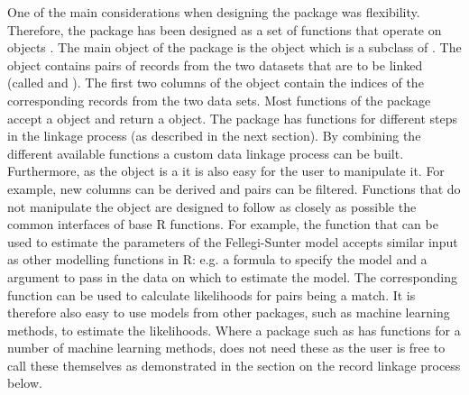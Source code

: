 One of the main considerations when designing the package was flexibility. Therefore, the package
has been designed as a set of functions that operate on  objects
\citep{datatable}. The main object of the package is the  object which is a subclass of
. The  object contains pairs of records from the two datasets that are
to be linked (called  and ). The first two columns of the  object
contain the indices of the corresponding records from the two data sets.  Most functions of the
package accept a  object and return a  object. The package has functions for
different steps in the linkage process (as described in the next section).  By combining the
different available functions a custom data linkage process can be built. Furthermore, as the
 object is a  it is also easy for the user to manipulate it. For
example, new columns can be derived and pairs can be filtered. Functions that do not manipulate the
 object are designed to follow as closely as possible the common interfaces of base R
functions. For example, the function  that can be used to estimate the parameters
of the Fellegi-Sunter model accepts similar input as other modelling functions in R: e.g. a formula
to specify the model and a  argument to pass in the data on which to estimate the model.
The corresponding  function can be used to calculate likelihoods for pairs being a
match.  It is therefore also easy to use models from other packages, such as machine learning
methods, to estimate the likelihoods.  Where a package such as  has functions for
a number of machine learning methods,  does not need these as the user is free to call
these themselves as demonstrated in the section on the record linkage process below. 

